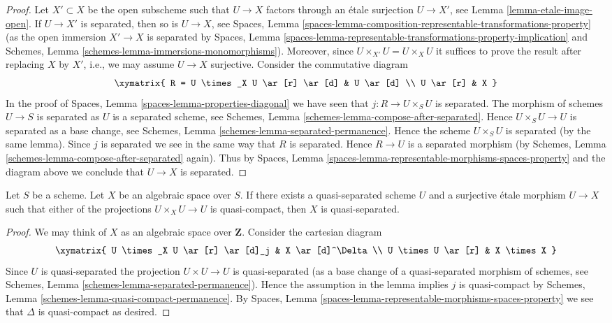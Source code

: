 \begin{proof}
Let $X' \subset X$ be the open subscheme such that $U \to X$ factors
through an \'etale surjection $U \to X'$, see
Lemma \ref{lemma-etale-image-open}.
If $U \to X'$ is separated, then so is $U \to X$, see
Spaces, Lemma
\ref{spaces-lemma-composition-representable-transformations-property}
(as the open immersion $X' \to X$ is separated by
Spaces, Lemma
\ref{spaces-lemma-representable-transformations-property-implication}
and
Schemes, Lemma \ref{schemes-lemma-immersions-monomorphisms}).
Moreover, since $U \times_{X'} U = U \times_X U$ it suffices
to prove the result after replacing $X$ by $X'$, i.e., we may
assume $U \to X$ surjective.
Consider the commutative diagram
$$
\xymatrix{
R = U \times_X U \ar[r] \ar[d] & U \ar[d] \\
U \ar[r] & X
}
$$
In the proof of
Spaces, Lemma \ref{spaces-lemma-properties-diagonal}
we have seen that $j : R \to U \times_S U$ is separated.
The morphism of schemes $U \to S$ is separated as $U$ is a separated
scheme, see
Schemes, Lemma \ref{schemes-lemma-compose-after-separated}.
Hence $U \times_S U \to U$ is separated as a base change, see
Schemes, Lemma \ref{schemes-lemma-separated-permanence}.
Hence the scheme $U \times_S U$ is separated (by the same lemma).
Since $j$ is separated we see in the same way that $R$ is separated.
Hence $R \to U$ is a separated morphism (by
Schemes, Lemma \ref{schemes-lemma-compose-after-separated}
again). Thus by
Spaces, Lemma \ref{spaces-lemma-representable-morphisms-spaces-property}
and the diagram above we conclude that $U \to X$ is separated.
\end{proof}

\begin{lemma}
\label{lemma-quasi-separated}
Let $S$ be a scheme. Let $X$ be an algebraic space over $S$.
If there exists a quasi-separated scheme $U$ and a surjective
\'etale morphism $U \to X$ such that either of the projections
$U \times_X U \to U$ is quasi-compact, then $X$ is quasi-separated.
\end{lemma}

\begin{proof}
We may think of $X$ as an algebraic space over $\mathbf{Z}$.
Consider the cartesian diagram
$$
\xymatrix{
U \times_X U \ar[r] \ar[d]_j & X \ar[d]^\Delta \\
U \times U \ar[r] & X \times X
}
$$
Since $U$ is quasi-separated the projection $U \times U \to U$ is
quasi-separated (as a base change of a quasi-separated morphism
of schemes, see Schemes, Lemma \ref{schemes-lemma-separated-permanence}).
Hence the assumption in the lemma implies $j$ is quasi-compact by
Schemes, Lemma \ref{schemes-lemma-quasi-compact-permanence}.
By Spaces, Lemma \ref{spaces-lemma-representable-morphisms-spaces-property}
we see that $\Delta$ is quasi-compact as desired.
\end{proof}

